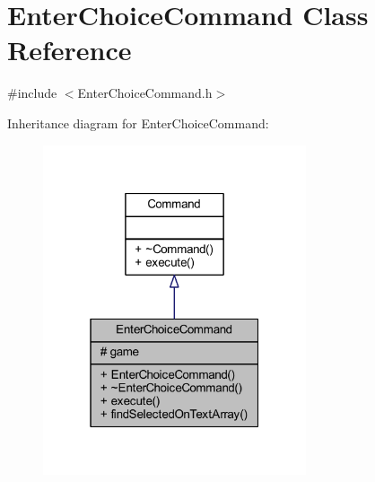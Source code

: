 \hypertarget{class_enter_choice_command}{}\section{Enter\+Choice\+Command Class Reference}
\label{class_enter_choice_command}


{\ttfamily \#include $<$Enter\+Choice\+Command.\+h$>$}



Inheritance diagram for Enter\+Choice\+Command\+:\nopagebreak
\begin{figure}[H]
\begin{center}
\leavevmode
\includegraphics[width=220pt]{class_enter_choice_command__inherit__graph}
\end{center}
\end{figure}



